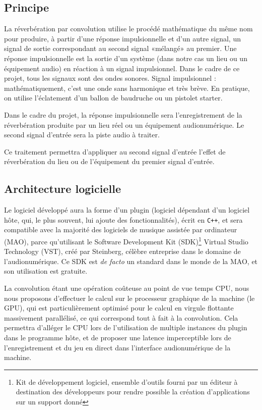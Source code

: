 		\subsection{Principe}
			La réverbération par convolution utilise le procédé mathématique du même nom pour produire, à partir d'une réponse impulsionnelle et d'un autre signal, un signal de sortie correspondant au second signal «mélangé» au premier.
			Une réponse impulsionnelle est la sortie d'un système (dans notre cas un lieu ou un équipement audio) en réaction à un signal impulsionnel. Dans le cadre de ce projet, tous les signaux sont des ondes sonores.
			Signal impulsionnel : mathématiquement, c'est une onde sans harmonique et très brève. En pratique, on utilise l'éclatement d'un ballon de baudruche ou un pistolet starter.

			Dans le cadre du projet, la réponse impulsionnelle sera l'enregistrement de la réverbération produite par un lieu réel ou un équipement audionumérique.
			Le second signal d'entrée sera la piste audio à traiter.

			Ce traitement permettra d'appliquer au second signal d'entrée l'effet de réverbération du lieu ou de l'équipement du premier signal d'entrée.

		
		\subsection{Architecture logicielle}
			Le logiciel développé aura la forme d'un plugin (logiciel dépendant d'un logiciel hôte, qui, le plus souvent, lui ajoute des fonctionnalités), écrit en {\tt C++}, et sera compatible avec la majorité des logiciels de musique assistée par ordinateur (MAO), parce qu'utilisant le Software Development Kit (SDK)\footnote{Kit de développement logiciel, ensemble d'outils fourni par un éditeur à destination des développeurs pour rendre possible la création d'applications sur un support donné}  Virtual Studio Technology (VST), créé par Steinberg, célèbre entreprise dans le domaine de l'audionumérique. Ce SDK est \emph{de facto} un standard dans le monde de la MAO, et son utilisation est gratuite.

			La convolution étant une opération coûteuse au point de vue temps CPU, nous nous proposons d'effectuer le calcul sur le processeur graphique de la machine (le GPU), qui est particulièrement optimisé pour le calcul en virgule flottante massivement parallélisé, ce qui correspond tout à fait à la convolution. Cela permettra d'alléger le CPU lors de l'utilisation de multiple instances du plugin dans le programme hôte, et de proposer une latence imperceptible lors de l'enregistrement et du jeu en direct dans l'interface audionumérique de la machine.


